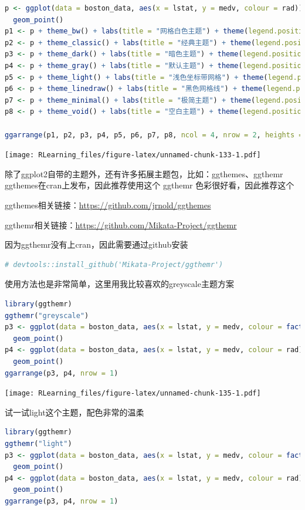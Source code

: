 \documentclass[]{ctexbook}
\begin{document}
\begin{lstlisting}[language=R]
p <- ggplot(data = boston_data, aes(x = lstat, y = medv, colour = rad)) +
  geom_point()
p1 <- p + theme_bw() + labs(title = "网格白色主题") + theme(legend.position = "none")
p2 <- p + theme_classic() + labs(title = "经典主题") + theme(legend.position = "none")
p3 <- p + theme_dark() + labs(title = "暗色主题") + theme(legend.position = "none")
p4 <- p + theme_gray() + labs(title = "默认主题") + theme(legend.position = "none")
p5 <- p + theme_light() + labs(title = "浅色坐标带网格") + theme(legend.position = "none")
p6 <- p + theme_linedraw() + labs(title = "黑色网格线") + theme(legend.position = "none")
p7 <- p + theme_minimal() + labs(title = "极简主题") + theme(legend.position = "none")
p8 <- p + theme_void() + labs(title = "空白主题") + theme(legend.position = "none")

ggarrange(p1, p2, p3, p4, p5, p6, p7, p8, ncol = 4, nrow = 2, heights = 1.2)
\end{lstlisting}

\texttt{[image: RLearning\_files/figure-latex/unnamed-chunk-133-1.pdf]}

除了ggplot2自带的主题外，还有许多拓展主题包，比如：ggthemes、ggthemr
ggthemes在cran上发布，因此推荐使用这个
ggthemr 色彩很好看，因此推荐这个

ggthemes相关链接：\url{https://github.com/jrnold/ggthemes}

ggthemr相关链接：\url{https://github.com/Mikata-Project/ggthemr}

因为ggthemr没有上cran，因此需要通过github安装

\begin{lstlisting}[language=R]
# devtools::install_github('Mikata-Project/ggthemr')
\end{lstlisting}

使用方法也是非常简单，这里用我比较喜欢的greyscale主题方案

\begin{lstlisting}[language=R]
library(ggthemr)
ggthemr("greyscale")
p3 <- ggplot(data = boston_data, aes(x = lstat, y = medv, colour = factor(rad))) +
  geom_point()
p4 <- ggplot(data = boston_data, aes(x = lstat, y = medv, colour = rad)) +
  geom_point()
ggarrange(p3, p4, nrow = 1)
\end{lstlisting}

\texttt{[image: RLearning\_files/figure-latex/unnamed-chunk-135-1.pdf]}

试一试light这个主题，配色非常的温柔

\begin{lstlisting}[language=R]
library(ggthemr)
ggthemr("light")
p3 <- ggplot(data = boston_data, aes(x = lstat, y = medv, colour = factor(rad))) +
  geom_point()
p4 <- ggplot(data = boston_data, aes(x = lstat, y = medv, colour = rad)) +
  geom_point()
ggarrange(p3, p4, nrow = 1)
\end{lstlisting}
\end{document}
